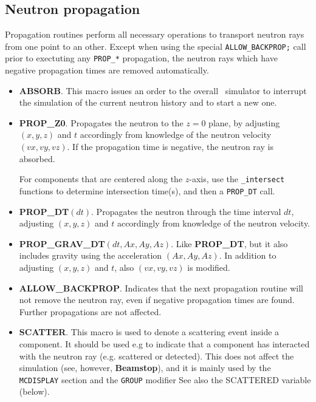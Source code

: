 \subsection{Neutron propagation}
Propagation routines perform all necessary operations to transport neutron rays
from one point to an other. Except when using the special
\verb+ALLOW_BACKPROP;+ call prior to exectuting any \verb+PROP_*+ propagation,
the neutron rays which have negative propagation times are removed automatically.
\begin{itemize}
\item {\bf ABSORB}. This macro issues an order to the overall
  \MCS\ simulator to interrupt the simulation of the current neutron
  history and to start a new one.
\item {\bf PROP\_Z0}. Propagates the neutron to the $z=0$ plane,
  by adjusting $(x,y,z)$ and $t$ accordingly from knowledge of the
  neutron velocity $(vx,vy,vz)$.
  If the propagation time is negative, the neutron ray is absorbed.

  For components that are centered along the $z$-axis,
  use the \verb+_intersect+ functions to determine intersection time(s),
  and then a \verb+PROP_DT+ call.
\item {\bf PROP\_DT}$(dt)$. Propagates the neutron through the
  time interval $dt$, adjusting $(x,y,z)$ and $t$ accordingly
  from knowledge of the neutron velocity.
\item {\bf PROP\_GRAV\_DT}$(dt,Ax,Ay,Az)$. Like {\bf PROP\_DT}, but it also
  includes gravity using the acceleration $(Ax,Ay,Az)$. In addition
  to adjusting $(x,y,z)$ and $t$, also $(vx,vy,vz)$ is modified.
\item {\bf ALLOW\_BACKPROP}. Indicates that the next propagation routine
  will not remove the neutron ray, even if negative propagation times
  are found. Further propagations are not affected.
\item {\bf SCATTER}. This macro is used to denote a scattering event
  inside a component.
  It should be used e.g
  to indicate that a component has interacted with the neutron ray
  (e.g. scattered or detected).
  This does not affect the simulation (see, however, {\bf Beamstop}),
  and it is mainly used by the
  \verb+MCDISPLAY+ section and the \verb+GROUP+ modifier
  See also the SCATTERED variable (below).
    
\end{itemize}


